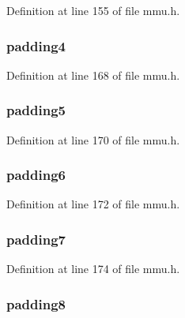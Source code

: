 Definition at line 155 of file mmu.\-h.

\hypertarget{structtaskstate_a2b559818ffd02a68e4d5ac320237a025}{
\subsubsection[{padding4}]{ padding4}}\label{structtaskstate_a2b559818ffd02a68e4d5ac320237a025}


Definition at line 168 of file mmu.\-h.

\hypertarget{structtaskstate_aa4adb792df4544b351afdded07baba05}{
\subsubsection[{padding5}]{ padding5}}\label{structtaskstate_aa4adb792df4544b351afdded07baba05}


Definition at line 170 of file mmu.\-h.

\hypertarget{structtaskstate_a79f9b7c8cb0db73082d203bd85b262b7}{
\subsubsection[{padding6}]{ padding6}}\label{structtaskstate_a79f9b7c8cb0db73082d203bd85b262b7}


Definition at line 172 of file mmu.\-h.

\hypertarget{structtaskstate_a8b3bd31ca992c4eec6bf4827d115e071}{
\subsubsection[{padding7}]{ padding7}}\label{structtaskstate_a8b3bd31ca992c4eec6bf4827d115e071}


Definition at line 174 of file mmu.\-h.

\hypertarget{structtaskstate_ae2ae739432db50973be3ad877bd1e109}{
\subsubsection[{padding8}]{ padding8}}\label{structtaskstate_ae2ae739432db50973be3ad877bd1e109}


